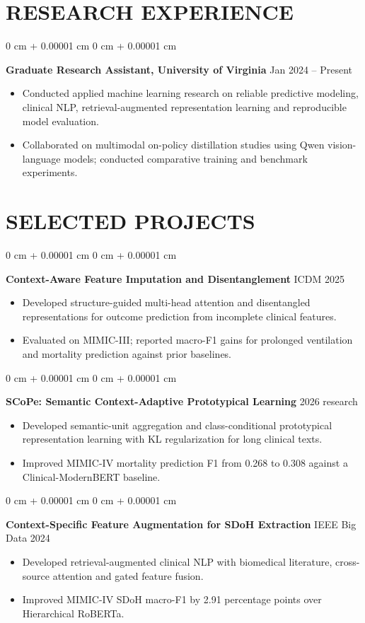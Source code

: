 \documentclass[10pt, letterpaper]{article}
\newenvironment{highlights}{
    \begin{itemize}[
        topsep=0.02 cm,
        parsep=0 cm,
        partopsep=0pt,
        itemsep=0pt,
        leftmargin=0 cm + 10pt
    ]
}{
    \end{itemize}
} %
\newenvironment{onecolentry}{
    \begin{adjustwidth}{
        0 cm + 0.00001 cm
    }{
        0 cm + 0.00001 cm
    }
}{
    \end{adjustwidth}
} %
\begin{document}
\section{RESEARCH EXPERIENCE}
\begin{onecolentry}
\textbf{Graduate Research Assistant, University of Virginia} \hfill Jan 2024 -- Present
\begin{highlights}
\item Conducted applied machine learning research on reliable predictive modeling, clinical NLP, retrieval-augmented representation learning and reproducible model evaluation.
\item Collaborated on multimodal on-policy distillation studies using Qwen vision-language models; conducted comparative training and benchmark experiments.
\end{highlights}
\end{onecolentry}
\section{SELECTED PROJECTS}
\begin{onecolentry}
\textbf{Context-Aware Feature Imputation and Disentanglement} \hfill ICDM 2025
\begin{highlights}
\item Developed structure-guided multi-head attention and disentangled representations for outcome prediction from incomplete clinical features.
\item Evaluated on MIMIC-III; reported macro-F1 gains for prolonged ventilation and mortality prediction against prior baselines.
\end{highlights}
\end{onecolentry}
\vspace{0.04 cm}
\begin{onecolentry}
\textbf{SCoPe: Semantic Context-Adaptive Prototypical Learning} \hfill 2026 research
\begin{highlights}
\item Developed semantic-unit aggregation and class-conditional prototypical representation learning with KL regularization for long clinical texts.
\item Improved MIMIC-IV mortality prediction F1 from 0.268 to 0.308 against a Clinical-ModernBERT baseline.
\end{highlights}
\end{onecolentry}
\vspace{0.04 cm}
\begin{onecolentry}
\textbf{Context-Specific Feature Augmentation for SDoH Extraction} \hfill IEEE Big Data 2024
\begin{highlights}
\item Developed retrieval-augmented clinical NLP with biomedical literature, cross-source attention and gated feature fusion.
\item Improved MIMIC-IV SDoH macro-F1 by 2.91 percentage points over Hierarchical RoBERTa.
\end{highlights}
\end{onecolentry}
\vspace{0.04 cm}
\end{document}
